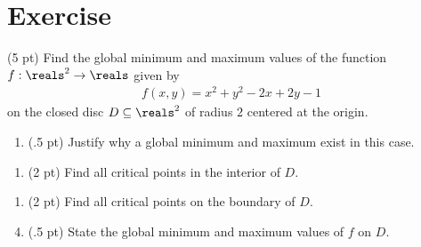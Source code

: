 \section{Exercise}

(5 pt) Find the global minimum and maximum values of the function $f: \reals^{2} \rightarrow \reals$ given by
\begin{align*}
f(x,y)
=
x^{2} + y^{2} - 2 x + 2 y -1
\end{align*}
on the closed disc $D \subseteq \reals^{2}$ of radius $2$ centered at the origin.
\begin{enumerate}[label=(\alph*)]
\item (.5 pt) Justify why a global minimum and maximum exist in this case. 
\end{enumerate}

\spaceSolution{.5in}{%
}%



\begin{enumerate}[resume,label=(\alph*)]
\item\label{itm: Quiz19 Interior Critical Points} (2 pt) Find all critical points in the interior of $D$. 
\end{enumerate}




\begin{enumerate}[resume,label=(\alph*)]
\item\label{itm: Quiz19 Boundary Critical Points} (2 pt) Find all critical points on the boundary of $D$. 
\end{enumerate}

\spaceSolution{2.5in}{%
}%



\begin{enumerate}[label=(\alph*)]
\setcounter{enumi}{3}
\item (.5 pt) State the global minimum and maximum values of $f$ on $D$.
\end{enumerate}

\spaceSolution{.5in}{%
}%